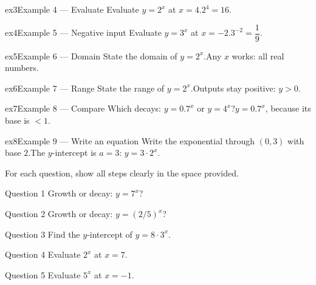 \documentclass[11pt]{article}
\begin{document}
\begin{example}{ex3}{Example 4 --- Evaluate}
Evaluate $y=2^{x}$ at $x=4$.\soln $2^4=16$.
\end{example}

\begin{example}{ex4}{Example 5 --- Negative input}
Evaluate $y=3^{x}$ at $x=-2$.\soln $3^{-2}=\dfrac{1}{9}$.
\end{example}

\begin{example}{ex5}{Example 6 --- Domain}
State the domain of $y=2^{x}$.\soln Any $x$ works: all real numbers.
\end{example}

\begin{example}{ex6}{Example 7 --- Range}
State the range of $y=2^{x}$.\soln Outputs stay positive: $y>0$.
\end{example}

\begin{example}{ex7}{Example 8 --- Compare}
Which decays: $y=0.7^{x}$ or $y=4^{x}$?\soln $y=0.7^{x}$, because its base is $<1$.
\end{example}

\begin{example}{ex8}{Example 9 --- Write an equation}
Write the exponential through $(0,3)$ with base $2$.\soln The $y$-intercept is $a=3$: $y=3\cdot2^{x}$.
\end{example}

\clearpage
{}
For each question, show all steps clearly in the space provided.

\begin{qbox}{Question 1}
Growth or decay: $y=7^{x}$?\workspace{2.4cm}
\end{qbox}

\begin{qbox}{Question 2}
Growth or decay: $y=(2/5)^{x}$?\workspace{2.4cm}
\end{qbox}

\begin{qbox}{Question 3}
Find the $y$-intercept of $y=8\cdot3^{x}$.\workspace{2.4cm}
\end{qbox}

\begin{qbox}{Question 4}
Evaluate $2^{x}$ at $x=7$.\workspace{2.4cm}
\end{qbox}

\begin{qbox}{Question 5}
Evaluate $5^{x}$ at $x=-1$.\workspace{2.4cm}
\end{qbox}
\end{document}
